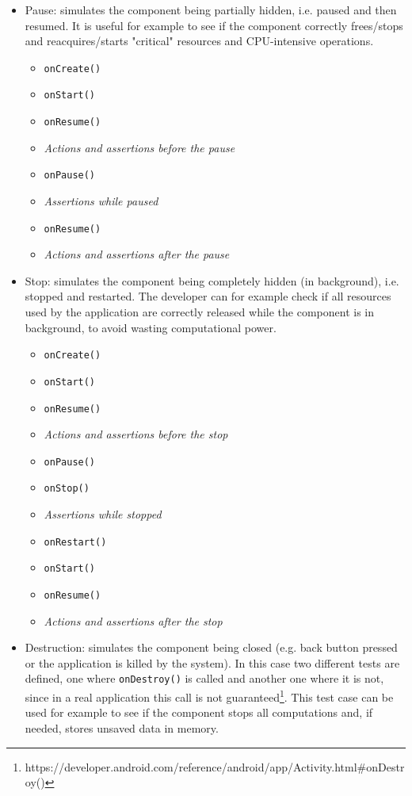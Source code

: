 \documentclass[11pt,a4paper,notitlepage]{article}
\begin{document}
\begin{itemize}
	\item Pause: simulates the component being partially hidden, i.e. paused and then resumed. It is useful for example to see if the component correctly frees/stops and reacquires/starts "critical" resources and CPU-intensive operations.
	\begin{itemize}
		\item \texttt{onCreate()}
		\item \texttt{onStart()}
		\item \texttt{onResume()}
		\item \textit{Actions and assertions before the pause}
		\item \texttt{onPause()}
		\item \textit{Assertions while paused}
		\item \texttt{onResume()}
		\item \textit{Actions and assertions after the pause}
	\end{itemize}
	\item Stop: simulates the component being completely hidden (in background), i.e. stopped and restarted. The developer can for example check if all resources used by the application are correctly released while the component is in background, to avoid wasting computational power.
	\begin{itemize}
		\item \texttt{onCreate()}
		\item \texttt{onStart()}
		\item \texttt{onResume()}
		\item \textit{Actions and assertions before the stop}
		\item \texttt{onPause()}
		\item \texttt{onStop()}
		\item \textit{Assertions while stopped}
		\item \texttt{onRestart()}
		\item \texttt{onStart()}
		\item \texttt{onResume()}
		\item \textit{Actions and assertions after the stop}
	\end{itemize}
	\item Destruction: simulates the component being closed (e.g. back button pressed or the application is killed by the system). In this case two different tests are defined, one where \texttt{onDestroy()} is called and another one where it is not, since in a real application this call is not guaranteed\footnote{https://developer.android.com/reference/android/app/Activity.html\#onDestroy()}. This test case can be used for example to see if the component stops all computations and, if needed, stores unsaved data in memory.

\end{itemize}
\end{document}

